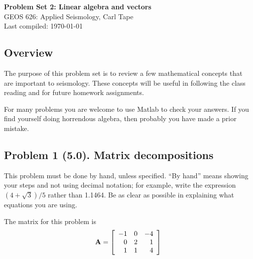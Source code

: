 \documentclass[11pt,titlepage,fleqn]{article}
\begin{document}

\begin{spacing}{1.2}
\centering
{\large \bf Problem Set 2: Linear algebra and vectors} \\
GEOS 626: Applied Seismology, Carl Tape \\
Last compiled: \today \\
\end{spacing}


\subsection*{Overview}

The purpose of this problem set is to review a few mathematical concepts that are important to seismology. These concepts will be useful in following the class reading \citep{SteinWysession,ShearerE2} and for future homework assignments.

For many problems you are welcome to use Matlab to check your answers. If you find yourself doing horrendous algebra, then probably you have made a prior mistake.


\subsection*{Problem 1 (5.0). Matrix decompositions}

This problem must be done by hand, unless specified. ``By hand'' means showing your steps and not using decimal notation; for example, write the expression $(4 +\sqrt{3})/5$ rather than 1.1464.
Be as clear as possible in explaining what equations you are using.

\medskip\noindent
The matrix for this problem is
%
\begin{equation*}
\mbox{${\bf A}$} =  \left[ \begin{array}{rrr}
    -1  &   0  &  -4 \\
     0  &   2  &   1 \\
     1  &   1  &   4 \\
\end{array} \right]
\end{equation*}


\end{document}
